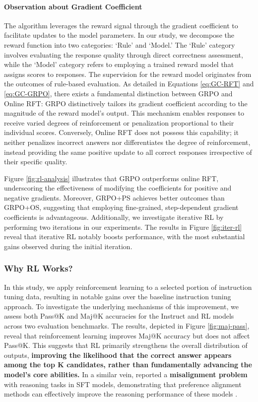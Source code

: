 \begin{itemize}[topsep=0pt]
\begin{itemize}[topsep=0pt]
\paragraph{Observation about Gradient Coefficient} The algorithm leverages the reward signal through the gradient coefficient to facilitate updates to the model parameters. In our study, we decompose the reward function into two categories: `Rule' and `Model.' The `Rule' category involves evaluating the response quality through direct correctness assessment, while the `Model' category refers to employing a trained reward model that assigns scores to responses. The supervision for the reward model originates from the outcomes of rule-based evaluation. As detailed in Equations \ref{eq:GC-RFT} and \ref{eq:GC-GRPO}, there exists a fundamental distinction between GRPO and Online RFT: GRPO distinctively tailors its gradient coefficient according to the magnitude of the reward model's output. This mechanism enables responses to receive varied degrees of reinforcement or penalization proportional to their individual scores. Conversely, Online RFT does not possess this capability; it neither penalizes incorrect answers nor differentiates the degree of reinforcement, instead providing the same positive update to all correct responses irrespective of their specific quality.

Figure \ref{fig:rl-analysis} illustrates that GRPO outperforms online RFT, underscoring the effectiveness of modifying the coefficients for positive and negative gradients. Moreover, GRPO+PS achieves better outcomes than GRPO+OS, suggesting that employing fine-grained, step-dependent gradient coefficients is advantageous. Additionally, we investigate iterative RL by performing two iterations in our experiments. The results in Figure \ref{fig:iter-rl} reveal that iterative RL notably boosts performance, with the most substantial gains observed during the initial iteration.

\subsubsection{Why RL Works?} In this study, we apply reinforcement learning to a selected portion of instruction tuning data, resulting in notable gains over the baseline instruction tuning approach. To investigate the underlying mechanisms of this improvement, we assess both Pass@K and Maj@K accuracies for the Instruct and RL models across two evaluation benchmarks. The results, depicted in Figure \ref{fig:maj-pass}, reveal that reinforcement learning improves Maj@K accuracy but does not affect Pass@K. This suggests that RL primarily strengthens the overall distribution of outputs, \textbf{improving the likelihood that the correct answer appears among the top K candidates, rather than fundamentally advancing the model’s core abilities.} In a similar vein, \citep{wang2023making} reported a \textbf{misalignment problem} with reasoning tasks in SFT models, demonstrating that preference alignment methods can effectively improve the reasoning performance of these models \citep{yuan2023rrhf,song2023preference,wang2023making}.


\end{itemize}
\end{itemize}

